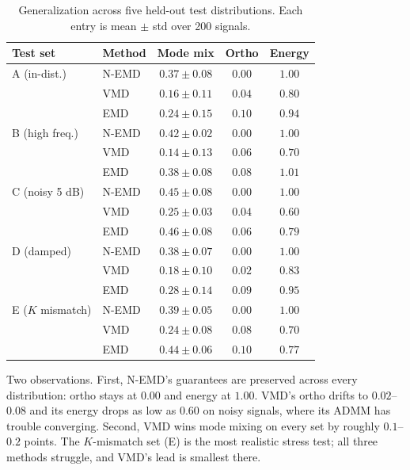 \documentclass[journal]{IEEEtran}
\begin{document}
\begin{table}[t]
\centering
\caption{Generalization across five held-out test distributions. Each entry is mean $\pm$ std over 200 signals.}
\label{tab:generalization}
\begin{tabular}{llccc}
\toprule
Test set & Method & Mode mix & Ortho & Energy \\
\midrule
A (in-dist.)      & N-EMD & $0.37{\pm}0.08$ & $\mathbf{0.00}$ & $\mathbf{1.00}$ \\
                  & VMD   & $\mathbf{0.16}{\pm}0.11$ & $0.04$ & $0.80$ \\
                  & EMD   & $0.24{\pm}0.15$ & $0.10$ & $0.94$ \\
\midrule
B (high freq.)    & N-EMD & $0.42{\pm}0.02$ & $\mathbf{0.00}$ & $\mathbf{1.00}$ \\
                  & VMD   & $\mathbf{0.14}{\pm}0.13$ & $0.06$ & $0.70$ \\
                  & EMD   & $0.38{\pm}0.08$ & $0.08$ & $1.01$ \\
\midrule
C (noisy 5 dB)    & N-EMD & $0.45{\pm}0.08$ & $\mathbf{0.00}$ & $\mathbf{1.00}$ \\
                  & VMD   & $\mathbf{0.25}{\pm}0.03$ & $0.04$ & $0.60$ \\
                  & EMD   & $0.46{\pm}0.08$ & $0.06$ & $0.79$ \\
\midrule
D (damped)        & N-EMD & $0.38{\pm}0.07$ & $\mathbf{0.00}$ & $\mathbf{1.00}$ \\
                  & VMD   & $\mathbf{0.18}{\pm}0.10$ & $0.02$ & $0.83$ \\
                  & EMD   & $0.28{\pm}0.14$ & $0.09$ & $0.95$ \\
\midrule
E ($K$ mismatch)  & N-EMD & $0.39{\pm}0.05$ & $\mathbf{0.00}$ & $\mathbf{1.00}$ \\
                  & VMD   & $\mathbf{0.24}{\pm}0.08$ & $0.08$ & $0.70$ \\
                  & EMD   & $0.44{\pm}0.06$ & $0.10$ & $0.77$ \\
\bottomrule
\end{tabular}
\end{table}

Two observations. First, N-EMD's guarantees are preserved across every distribution: ortho stays at $0.00$ and energy at $1.00$. VMD's ortho drifts to $0.02$--$0.08$ and its energy drops as low as $0.60$ on noisy signals, where its ADMM has trouble converging. Second, VMD wins mode mixing on every set by roughly $0.1$--$0.2$ points. The $K$-mismatch set (E) is the most realistic stress test; all three methods struggle, and VMD's lead is smallest there.
\end{document}
